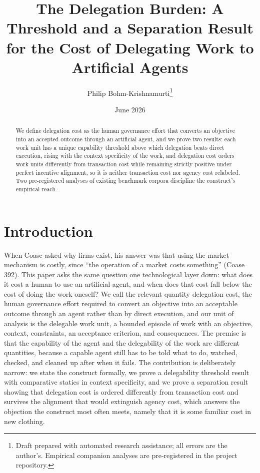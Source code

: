 \documentclass[10pt]{article}
\title{The Delegation Burden: A Threshold and a Separation Result for the Cost of Delegating Work to Artificial Agents}
\author{Philip Bohm-Krishnamurti\thanks{Draft prepared with automated research assistance; all errors are the author's. Empirical companion analyses are pre-registered in the project repository.}}
\date{June 2026}
\theoremstyle{remark}
\begin{document}
\maketitle

\begin{abstract}
\noindent We define delegation cost as the human governance effort that converts an objective into an accepted outcome through an artificial agent, and we prove two results: each work unit has a unique capability threshold above which delegation beats direct execution, rising with the context specificity of the work, and delegation cost orders work units differently from transaction cost while remaining strictly positive under perfect incentive alignment, so it is neither transaction cost nor agency cost relabeled. Two pre-registered analyses of existing benchmark corpora discipline the construct's empirical reach.
\end{abstract}

\section{Introduction}

When Coase asked why firms exist, his answer was that using the market mechanism is costly, since ``the operation of a market costs something'' (Coase 392). This paper asks the same question one technological layer down: what does it cost a human to use an artificial agent, and when does that cost fall below the cost of doing the work oneself? We call the relevant quantity delegation cost, the human governance effort required to convert an objective into an acceptable outcome through an agent rather than by direct execution, and our unit of analysis is the delegable work unit, a bounded episode of work with an objective, context, constraints, an acceptance criterion, and consequences. The premise is that the capability of the agent and the delegability of the work are different quantities, because a capable agent still has to be told what to do, watched, checked, and cleaned up after when it fails. The contribution is deliberately narrow: we state the construct formally, we prove a delegability threshold result with comparative statics in context specificity, and we prove a separation result showing that delegation cost is ordered differently from transaction cost and survives the alignment that would extinguish agency cost, which answers the objection the construct most often meets, namely that it is some familiar cost in new clothing.
\end{document}
